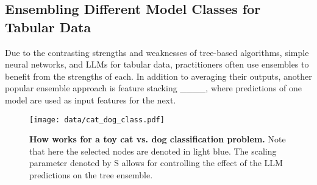 \subsection{Ensembling Different Model Classes for Tabular Data}
Due to the contrasting strengths and weaknesses of tree-based algorithms, simple neural networks, and LLMs for tabular data, practitioners often use ensembles to benefit from the strengths of each. In addition to averaging their outputs, another popular ensemble approach is feature stacking ____, where predictions of one model are used as input features for the next.

\begin{figure}[h]
    \centering
    \texttt{[image: data/cat\_dog\_class.pdf]}
    \caption{\textbf{How \methodname works for a toy cat vs. dog classification problem.} Note that here the selected nodes are denoted in light blue. The scaling parameter denoted by S allows for controlling the effect of the LLM predictions on the tree ensemble.}
    \label{fig:cat_dog}
\end{figure}
